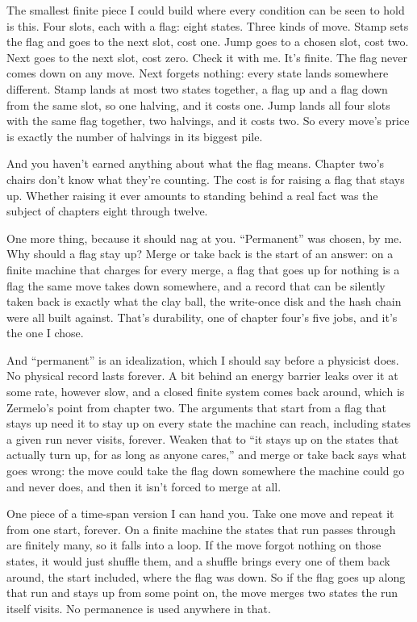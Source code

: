 \documentclass[11pt,twoside]{article}
\theoremstyle{thielethm}
\theoremstyle{thieledef}
\theoremstyle{thieledef}
\theoremstyle{thieledef}
\theoremstyle{thielethm}
\theoremstyle{thieleobs}
\theoremstyle{thielethm}
\begin{document}
The smallest finite piece I could build where every condition can be seen to hold is this. Four slots, each with a flag: eight states. Three kinds of move. Stamp sets the flag and goes to the next slot, cost one. Jump goes to a chosen slot, cost two. Next goes to the next slot, cost zero. Check it with me. It's finite. The flag never comes down on any move. Next forgets nothing: every state lands somewhere different. Stamp lands at most two states together, a flag up and a flag down from the same slot, so one halving, and it costs one. Jump lands all four slots with the same flag together, two halvings, and it costs two. So every move's price is exactly the number of halvings in its biggest pile.

And you haven't earned anything about what the flag means. Chapter two's chairs don't know what they're counting. The cost is for raising a flag that stays up. Whether raising it ever amounts to standing behind a real fact was the subject of chapters eight through twelve.

One more thing, because it should nag at you. ``Permanent'' was chosen, by me. Why should a flag stay up? Merge or take back is the start of an answer: on a finite machine that charges for every merge, a flag that goes up for nothing is a flag the same move takes down somewhere, and a record that can be silently taken back is exactly what the clay ball, the write-once disk and the hash chain were all built against. That's durability, one of chapter four's five jobs, and it's the one I chose.

And ``permanent'' is an idealization, which I should say before a physicist does. No physical record lasts forever. A bit behind an energy barrier leaks over it at some rate, however slow, and a closed finite system comes back around, which is Zermelo's point from chapter two. The arguments that start from a flag that stays up need it to stay up on every state the machine can reach, including states a given run never visits, forever. Weaken that to ``it stays up on the states that actually turn up, for as long as anyone cares,'' and merge or take back says what goes wrong: the move could take the flag down somewhere the machine could go and never does, and then it isn't forced to merge at all.

One piece of a time-span version I can hand you. Take one move and repeat it from one start, forever. On a finite machine the states that run passes through are finitely many, so it falls into a loop. If the move forgot nothing on those states, it would just shuffle them, and a shuffle brings every one of them back around, the start included, where the flag was down. So if the flag goes up along that run and stays up from some point on, the move merges two states the run itself visits. No permanence is used anywhere in that.
\end{document}
